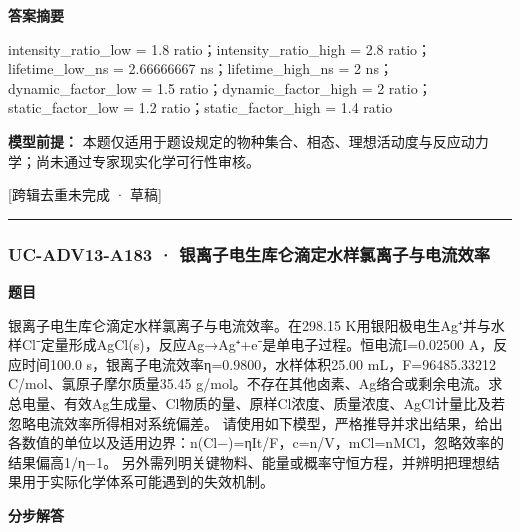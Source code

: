 \documentclass[UTF8,11pt,a4paper]{ctexart}
\begin{document}
\noindent\textbf{答案摘要}\par
intensity\_ratio\_low = 1.8 ratio；intensity\_ratio\_high = 2.8 ratio；lifetime\_low\_ns = 2.66666667 ns；lifetime\_high\_ns = 2 ns；dynamic\_factor\_low = 1.5 ratio；dynamic\_factor\_high = 2 ratio；static\_factor\_low = 1.2 ratio；static\_factor\_high = 1.4 ratio\par
\noindent\textbf{模型前提：}
本题仅适用于题设规定的物种集合、相态、理想活动度与反应动力学；尚未通过专家现实化学可行性审核。\par
\noindent\textcolor{red!65!black}{[跨辑去重未完成 · 草稿]} \par
\medskip\hrule\medskip
{}
\subsubsection*{UC-ADV13-A183 · 银离子电生库仑滴定水样氯离子与电流效率}
\noindent\textbf{题目}\par
银离子电生库仑滴定水样氯离子与电流效率。在298.15 K用银阳极电生Ag⁺并与水样Cl⁻定量形成AgCl(s)，反应Ag→Ag⁺+e⁻是单电子过程。恒电流I=0.02500 A，反应时间100.0 s，银离子电流效率η=0.9800，水样体积25.00 mL，F=96485.33212 C/mol、氯原子摩尔质量35.45 g/mol。不存在其他卤素、Ag络合或剩余电流。求总电量、有效Ag生成量、Cl物质的量、原样Cl浓度、质量浓度、AgCl计量比及若忽略电流效率所得相对系统偏差。 请使用如下模型，严格推导并求出结果，给出各数值的单位以及适用边界：n(Cl−)=ηIt/F，c=n/V，mCl=nMCl，忽略效率的结果偏高1/η−1。 另外需列明关键物料、能量或概率守恒方程，并辨明把理想结果用于实际化学体系可能遇到的失效机制。\par
\medskip\noindent\textbf{分步解答}
\end{document}
